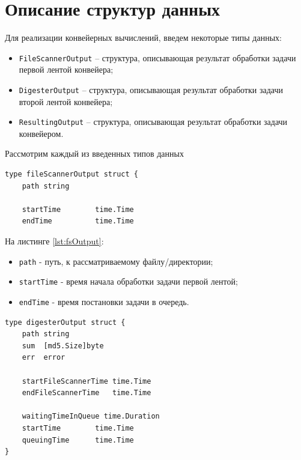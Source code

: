 \section{Описание структур данных}

Для реализации конвейерных вычислений, введем некоторые типы данных:
\begin{itemize}
	\item \texttt{FileScannerOutput} – структура, описывающая результат обработки задачи первой лентой конвейера;
	\item \texttt{DigesterOutput} – структура, описывающая результат обработки задачи второй лентой конвейера;
	\item \texttt{ResultingOutput} – структура, описывающая результат обработки задачи конвейером.
\end{itemize}

Рассмотрим каждый из введенных типов данных

\begin{lstlisting}[label=lst:fsOutput,caption={Определение типов данных. FileScannerOutput}]
type fileScannerOutput struct {
	path string

	startTime        time.Time
	endTime          time.Time
\end{lstlisting}

На листинге \ref{lst:fsOutput}:
\begin{itemize}
	\item \texttt{path} - путь, к рассматриваемому файлу/директории;
	\item \texttt{startTime} - время начала обработки задачи первой лентой;
	\item \texttt{endTime} - время постановки задачи в очередь.
\end{itemize}


\begin{lstlisting}[label=lst:dOutput,caption={Определение типов данных. DigesterOutput}]
type digesterOutput struct {
	path string
	sum  [md5.Size]byte
	err  error

	startFileScannerTime time.Time
	endFileScannerTime   time.Time

	waitingTimeInQueue time.Duration
	startTime        time.Time
	queuingTime      time.Time
}
\end{lstlisting}
	
